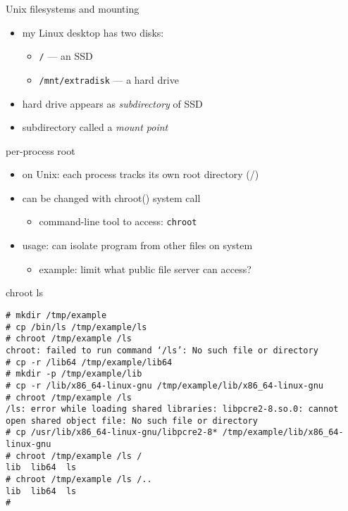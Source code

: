\begin{frame}{Unix filesystems and mounting}
    \begin{itemize}
    \item my Linux desktop has two disks:
        \begin{itemize}
        \item \texttt{/} --- an SSD
        \item \texttt{/mnt/extradisk} --- a hard drive
        \end{itemize}
    \item hard drive appears as \textit{subdirectory} of SSD
    \item subdirectory called a \textit{mount point}
    \end{itemize}
\end{frame}

\begin{frame}[fragile,label=perProcessRoot]{per-process root}
    \begin{itemize}
    \item on Unix: each process tracks its own root directory (/)
    \item can be changed with chroot() system call
        \begin{itemize}
        \item command-line tool to access: \texttt{chroot}
        \end{itemize}
    \vspace{.5cm}
    \item usage: can isolate program from other files on system
        \begin{itemize}
        \item example: limit what public file server can access?
        \end{itemize}
    \end{itemize}
\end{frame}

\begin{frame}[fragile,label=lsChrootExample]{chroot ls}
\begin{lstlisting}[language={},style=smaller]
# mkdir /tmp/example
# cp /bin/ls /tmp/example/ls
# chroot /tmp/example /ls
chroot: failed to run command ‘/ls’: No such file or directory
# cp -r /lib64 /tmp/example/lib64
# mkdir -p /tmp/example/lib
# cp -r /lib/x86_64-linux-gnu /tmp/example/lib/x86_64-linux-gnu
# chroot /tmp/example /ls
/ls: error while loading shared libraries: libpcre2-8.so.0: cannot open shared object file: No such file or directory
# cp /usr/lib/x86_64-linux-gnu/libpcre2-8* /tmp/example/lib/x86_64-linux-gnu
# chroot /tmp/example /ls /
lib  lib64  ls
# chroot /tmp/example /ls /..
lib  lib64  ls
# 
\end{lstlisting}
\end{frame}

